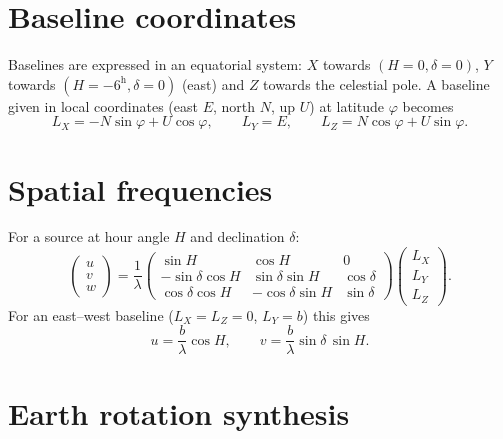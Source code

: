 
\section{Baseline coordinates}

Baselines are expressed in an equatorial system: $X$ towards
$(H=0,\delta=0)$, $Y$ towards $(H=-6^{\mathrm h},\delta=0)$ (east) and
$Z$ towards the celestial pole. A baseline given in local coordinates
(east $E$, north $N$, up $U$) at latitude $\varphi$ becomes
\begin{equation}
  L_X = -N\sin\varphi + U\cos\varphi,\qquad
  L_Y = E,\qquad
  L_Z = N\cos\varphi + U\sin\varphi .
\end{equation}

\section{Spatial frequencies}

For a source at hour angle $H$ and declination $\delta$:
\begin{equation}
  \begin{pmatrix} u\\ v\\ w \end{pmatrix}
  = \frac{1}{\lambda}
  \begin{pmatrix}
    \sin H & \cos H & 0\\
    -\sin\delta\cos H & \sin\delta\sin H & \cos\delta\\
    \cos\delta\cos H & -\cos\delta\sin H & \sin\delta
  \end{pmatrix}
  \begin{pmatrix} L_X\\ L_Y\\ L_Z \end{pmatrix} .
  \label{eq:uvw}
\end{equation}
For an east--west baseline ($L_X=L_Z=0$, $L_Y=b$) this gives
\begin{equation}
  u = \frac{b}{\lambda}\cos H,\qquad
  v = \frac{b}{\lambda}\sin\delta\,\sin H .
\end{equation}

\section{Earth rotation synthesis}

